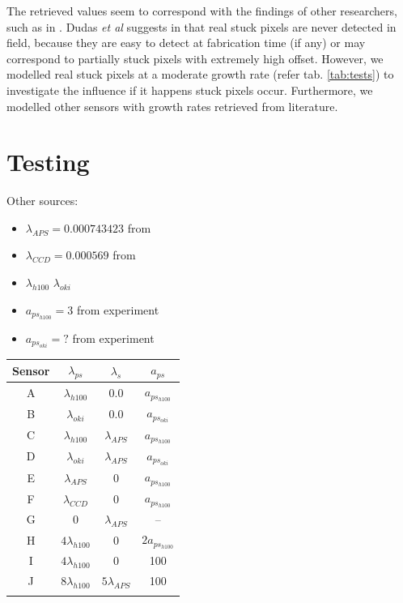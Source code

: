 \documentclass[10pt,twocolumn,letterpaper]{article}
\begin{document}
The retrieved values seem to correspond with the findings of other researchers, such as in \cite{defectDetection, leung}. Dudas \emph{et al} suggests in \cite{inFieldDefects} that real stuck pixels are never detected in field, because they are easy to detect at fabrication time (if any) or may correspond to partially stuck pixels with extremely high offset. However, we modelled real stuck pixels at a moderate growth rate (refer tab. \ref{tab:tests}) to investigate the influence if it happens stuck pixels occur. Furthermore, we modelled other sensors with growth rates retrieved from literature.




 \section{Testing}
 \label{testing}
 
 Other sources:
 \begin{itemize}
 \item $\lambda_{APS} = \num{0.000743423}$ from \cite{leung}
 \item $\lambda_{CCD} = \num{0.000569}$ from \cite{leung} 
 \item $\lambda_{h100}$ $\lambda_{oki}$ 
 \item $a_{ps_{h100}} = 3$ from experiment
 \item $a_{ps_{oki}} = ?$ from experiment
 
 \end{itemize}

 
 
 \begin{tabular}{c c c c }
 Sensor & $\lambda_{ps}$ & $\lambda_{s}$ & $a_{ps}$  \\
 \hline
 A	&	$\lambda_{h100}$ & 0.0 & $a_{ps_{h100}}$ \\
 B	&	$\lambda_{oki}$	& 0.0	& $a_{ps_{oki}}$   \\
 C & $\lambda_{h100}$ & $\lambda_{APS}$ & $a_{ps_{h100}}$ \\
 D & $\lambda_{oki}$ & $\lambda_{APS}$ & $a_{ps_{oki}}$    \\
 E & $\lambda_{APS}$ & 0 & $a_{ps_{h100}}$    \\
 F & $\lambda_{CCD}$ & 0 & $a_{ps_{h100}}$   \\
 G & 0 & $\lambda_{APS}$ & -- \\
 H & $ 4 \lambda_{h100}$ & 0 & $ 2 a_{ps_{h100}}$ \\
 I & $ 4 \lambda_{h100}$ & 0 & 100 \\
 J & $ 8 \lambda_{h100}$ &  $ 5 \lambda_{APS}$ & 100 \\
 \label{tab:tests}
 \end{tabular}
 
\end{document}
